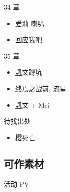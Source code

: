 \documentclass[a4paper]{article}
\begin{document}
34 章

\begin{itemize}
    \item \href{https://www.bilibili.com/video/BV1hK411r74y/?p=2&t=2380} 爱莉 喇叭
    \item \href{https://www.bilibili.com/video/BV1hK411r74y/?p=3&t=4084} 回应我吧
\end{itemize}

35 章

\begin{itemize}
    \item \href{https://www.bilibili.com/video/BV1BT411S7q4/?t=122} 凯文蹲坑
    \item \href{https://www.bilibili.com/video/BV1BT411S7q4/?p=4&t=1926} 终焉之战前, 流星
    \item \href{https://www.bilibili.com/video/BV1BT411S7q4/?p=5&t=3265} 凯文 + Mei
\end{itemize}

待找出处

\begin{itemize}
    \item \href{https://www.bilibili.com/video/BV1it4y137GM/?t=109} 樱死亡
\end{itemize}

\subsection{可作素材}

活动 PV
\end{document}
